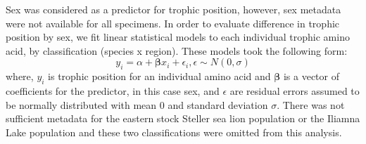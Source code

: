 \documentclass [11pt, proquest] {uwthesis}[2015/03/03]
\begin{document}
Sex was considered as a predictor for trophic position, however, sex
metadata were not available for all specimens. In order to evaluate
difference in trophic position by sex, we fit linear statistical models
to each individual trophic amino acid, by classification (species x
region). These models took the following form:
\begin{equation} 
y_i = \alpha + \boldsymbol\beta x_i + \epsilon_i, \epsilon \sim N(0,\sigma)
  \label{eq:linsex}
\end{equation}
where, \(y_i\) is trophic position for an individual amino acid and
\(\boldsymbol\beta\) is a vector of coefficients for the predictor, in
this case sex, and \(\epsilon\) are residual errors assumed to be
normally distributed with mean 0 and standard deviation \(\sigma\).
There was not sufficient metadata for the eastern stock Steller sea lion
population or the Iliamna Lake population and these two classifications
were omitted from this analysis.
\end{document}
